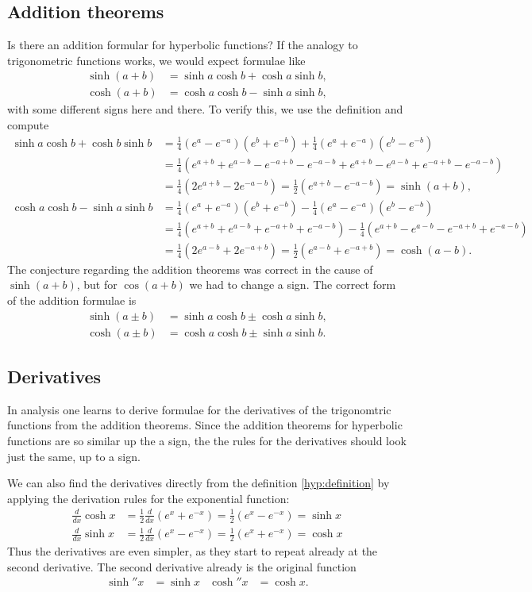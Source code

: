 \subsection{Addition theorems}
Is there an addition formular for hyperbolic functions?
If the analogy to trigonometric functions works, we would expect 
formulae like
\begin{align*}
\sinh(a+b)&=\sinh a\cosh b + \cosh a\sinh b,\\
\cosh(a+b)&=\cosh a\cosh b - \sinh a\sinh b,
\end{align*}
with some different signs here and there.
To verify this, we use the definition and compute
\begin{align*}
\sinh a\cosh b + \cosh b\sinh b
&=
\frac14(e^a-e^{-a})(e^b+e^{-b})
+
\frac14(e^a+e^{-a})(e^b-e^{-b})
\\
&=\frac14(e^{a+b}+e^{a-b}-e^{-a+b}-e^{-a-b} + e^{a+b}-e^{a-b}+e^{-a+b}-e^{-a-b})
\\
&=
\frac14(2e^{a+b}-2e^{-a-b})
=
\frac12(e^{a+b}-e^{-a-b})=\sinh(a+b),
\\
\cosh a\cosh b-\sinh a\sinh b
&=
\frac14(e^a+e^{-a})(e^b+e^{-b})
-
\frac14(e^a-e^{-a})(e^b-e^{-b})
\\
&=
\frac14(e^{a+b}+e^{a-b}+e^{-a+b}+e^{-a-b})
-
\frac14(e^{a+b}-e^{a-b}-e^{-a+b}+e^{-a-b})
\\
&=
\frac14(2e^{a-b}+2e^{-a+b})
=
\frac12(e^{a-b}+e^{-a+b})=\cosh(a-b).
\end{align*}
The conjecture regarding the addition theorems was correct in the cause
of $\sinh(a+b)$, but for $\cos(a+b)$ we had to change a sign.
The correct form of the addition formulae is
\begin{align*}
\sinh(a\pm b)&=\sinh a\cosh b \pm \cosh a\sinh b,\\
\cosh(a\pm b)&=\cosh a\cosh b \pm \sinh a\sinh b.
\end{align*}

\subsection{Derivatives}
In analysis one learns to derive formulae for the derivatives of the
trigonomtric functions from the addition theorems.
Since the addition theorems for hyperbolic functions are so similar
up the a sign, the the rules for the derivatives should look just the
same, up to a sign.

We can also find the derivatives directly from the definition
\eqref{hyp:definition} by applying the derivation rules for the
exponential function:
\begin{align*}
\frac{d}{dx}\cosh x
&=
\frac12\frac{d}{dx}(e^x+e^{-x})
=
\frac12(e^x-e^{-x})=\sinh x
\\
\frac{d}{dx}\sinh x
&=
\frac12\frac{d}{dx}(e^x-e^{-x})
=
\frac12(e^x+e^{-x})=\cosh x
\end{align*}
Thus the derivatives are even simpler, as they start to repeat already
at the second derivative.
The second derivative already is the original function
\begin{align*}
\sinh''x&=\sinh x
&
\cosh''x&=\cosh x.
\end{align*}

